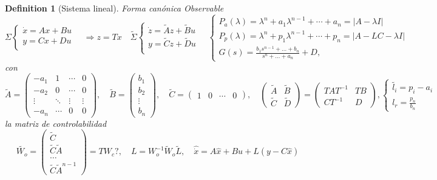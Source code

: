 \documentclass[leqno]{article}
\newtheorem*{definition}{Definition}
\begin{document}
\begin{definition}[Sistema lineal] Forma canónica Observable
\[
\Sigma  \begin{cases}
  \dot{x}=Ax + Bu \\ 
  y = Cx + Du\\
\end{cases}
\quad \Rightarrow z=Tx \quad 
\tilde{\Sigma }  \begin{cases}
  \dot{z} = \tilde{A}z + \tilde{B}u \\
  y = \tilde{C} z + \tilde{D}u\\
\end{cases}
\quad \begin{cases}
 P_a(\lambda) = \lambda^n +  a_1 \lambda^{n-1} + \cdots + a_n = |A-\lambda I|\\
 P_{p}(\lambda) = \lambda^n + p_1\lambda^{n-1} + \cdots +  p_n = |A-LC-\lambda I|\\
 G(s) = \frac{b_1s ^{n-1}+ \ldots + b_n}{ s^n + \ldots+ a_n} + D,
\end{cases}
\] 
con 
\[
  \tilde{A} = \begin{pmatrix} -a_1 & 1 & \cdots & 0 \\ -a_2 & 0 & \cdots & 0 \\ \vdots & \ddots & \vdots & \vdots \\ -a_n & \cdots & 0 & 0  \end{pmatrix}
  , \quad \tilde{B} = \begin{pmatrix} b_1\\ b_2 \\ \vdots \\b_n \end{pmatrix},
  \quad \tilde{C} = \begin{pmatrix} 1 & 0 & \cdots & 0 \end{pmatrix},
  \quad \begin{pmatrix} \tilde{A} & \tilde{B} \\ \tilde{C} & \tilde{D} \end{pmatrix}  = \begin{pmatrix} TAT^{-1} & TB \\ CT^{-1} & D \end{pmatrix}, \begin{cases}
\tilde{l_i} = p_i-a_i \\ l_r = \frac{p_n}{b_n} \end{cases}
\] 
la matriz de controlabilidad
\[
  \tilde{W_o} = \begin{pmatrix} \tilde{C} \\ \tilde{C}\tilde{A} \\ \ldots \\ \tilde{C}\tilde{A}^{n-1} \end{pmatrix} = TW_c ?, \quad  L = W_o^{-1}\tilde{W}_o \tilde{L}, \quad \hat{\dot{x}} = A\hat{x} + Bu + L (y-C \hat{x}) 
\] 
\end{definition}
\end{document}
